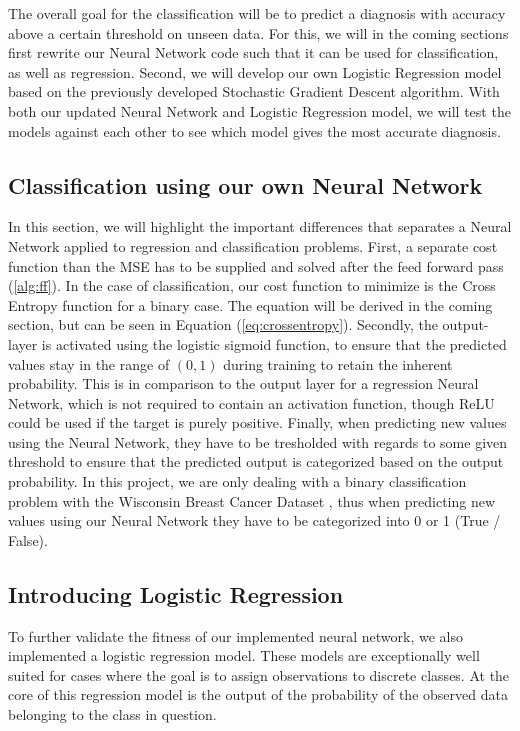 \documentclass
[twocolumn,
secnumarabic,
nobibnotes,
aps,
prl,
reprint,
groupedaddress,
amsmath,
amssymb
]{revtex4-2}
\begin{document}
The overall goal for the classification will be to predict a diagnosis with accuracy above a certain threshold on unseen data. For this, we will in the coming sections first rewrite our Neural Network code such that it can be used for classification, as well as regression. Second, we will develop our own Logistic Regression model based on the previously developed Stochastic Gradient Descent algorithm. With both our updated Neural Network and Logistic Regression model, we will test the models against each other to see which model gives the most accurate diagnosis.

\subsection{Classification using our own Neural Network}
In this section, we will highlight the important differences that separates a Neural Network applied to regression and classification problems. First, a separate cost function than the MSE has to be supplied and solved after the feed forward pass (\ref{alg:ff}). In the case of classification, our cost function to minimize is the Cross Entropy function for a binary case. The equation will be derived in the coming section, but can be  seen in Equation (\ref{eq:crossentropy}).
Secondly, the output-layer is activated using the logistic sigmoid function, to ensure that the predicted values stay in the range of $(0,1)$ during training to retain the inherent probability. This is in comparison to the output layer for a regression Neural Network, which is not required to contain an activation function, though ReLU could be used if the target is purely positive. Finally, when predicting new values using the Neural Network, they have to be tresholded with regards to some given threshold to ensure that the predicted output is categorized based on the output probability. In this project, we are only dealing with a binary classification problem with the Wisconsin Breast Cancer Dataset \cite{scikit-learn}, thus when predicting new values using our Neural Network they have to be categorized into 0 or 1 (True / False).

\subsection{Introducing Logistic Regression}
To further validate the fitness of our implemented neural network, we also implemented a logistic regression model.  These models are exceptionally well suited for cases where the goal is to assign observations to discrete classes. At the core of this regression model is the output of the probability of  the observed data belonging to the class in question.
\end{document}
